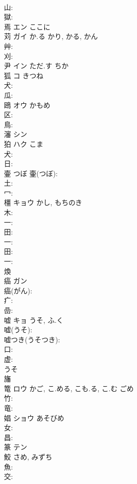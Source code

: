 \documentclass[8pt]{extreport}
\begin{document}
\begin{CJK}{UTF8}{min}
\\	山: 
\\	獄: 
\\	焉	エン ここに			
\\	苅	ガイ	か.る	かり, かる, かん	
\\	艸: 
\\	刈: 
\\	尹	イン ただ.す ちか			
\\	狐	コ	きつね		
\\	犬: 
\\	瓜: 
\\	鴎	オウ	かもめ		
\\	区: 
\\	鳥: 
\\	瀋	シン			
\\	狛	ハク	こま		
\\	犬: 
\\	日: 
\\	壷		つぼ			壷(つぼ): 
\\	土: 
\\	冖: 
\\	橿	キョウ	かし, もちのき		
\\	木: 
\\	一: 
\\	田: 
\\	一: 
\\	田: 
\\	一: 
\\	煥						
\\	癌	ガン			
\\	癌(がん): 
\\	疒: 
\\	嵒: 
\\	嘘	キョ	うそ, ふ.く		
\\	嘘(うそ): 
\\	嘘つき(うそつき): 
\\	口: 
\\	虚: 
\\	うそ 
\\	旛						
\\	篭	ロウ	かご, こ.める, こも.る, こ.む	ごめ	
\\	竹: 
\\	竜: 
\\	娼	ショウ	あそびめ		
\\	女: 
\\	昌: 
\\	篆	テン			
\\	鮫		さめ, みずち				
\\	魚: 
\\	交: 

\end{CJK}
\end{document}
